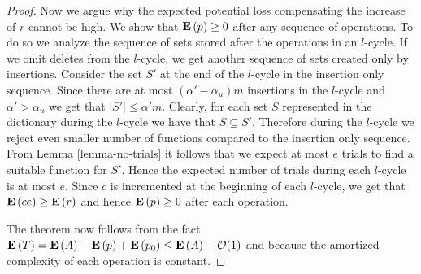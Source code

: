 \begin{proof}
Now we argue why the expected potential loss compensating the increase of $r$ cannot be high.
We show that $\mathbf{E}\left(p\right) \geq 0$ after any sequence of operations.
To do so we analyze the sequence of sets stored after the operations in an $l$-cycle.
If we omit deletes from the $l$-cycle, we get another sequence of sets created only by insertions.
Consider the set $S'$ at the end of the $l$-cycle in the insertion only sequence. 
Since there are at most $(\alpha' - \alpha_u)m$ insertions in the $l$-cycle and $\alpha' > \alpha_u$ we get that $|S'| \leq \alpha' m$.
Clearly, for each set $S$ represented in the dictionary during the $l$-cycle we have that $S \subseteq S'$. 
Therefore during the $l$-cycle we reject even smaller number of functions compared to the insertion only sequence.
From Lemma \ref{lemma-no-trials} it follows that we expect at most $e$ trials to find a suitable function for $S'$. 
Hence the expected number of trials during each $l$-cycle is at most $e$.
Since $c$ is incremented at the beginning of each $l$-cycle, we get that $\mathbf{E}\left(ce\right) \geq \mathbf{E}\left(r\right)$ and hence $\mathbf{E}\left(p\right) \geq 0$ after each operation.

The theorem now follows from the fact $\mathbf{E}\left(T\right) = \mathbf{E}\left(A\right) - \mathbf{E}\left(p\right) + \mathbf{E}\left(p_0\right) \leq \mathbf{E}\left(A\right) + \mathcal{O}(1)$ and because the amortized complexity of each operation is constant.
\end{proof}
